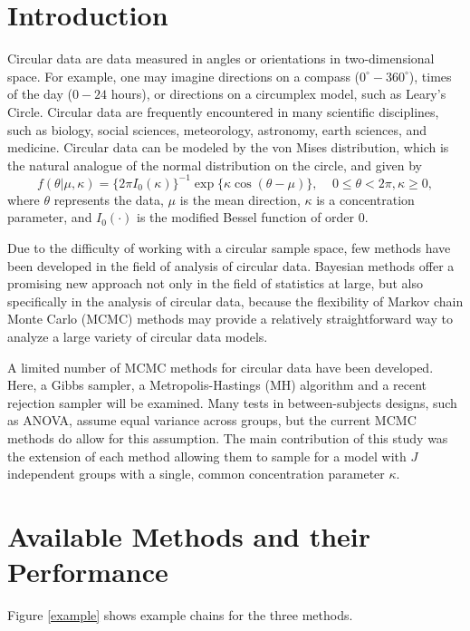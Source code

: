 \documentclass[11pt,a4paper]{article}
\begin{document}
\section{Introduction}
\label{Sect:intro}

Circular data are data measured in angles or orientations in two-dimensional space. For example, one may imagine directions on a compass ($0^\circ - 360^\circ$), times of the day ($0 - 24$ hours), or directions on a circumplex model, such as Leary's Circle. Circular data are frequently encountered in many scientific disciplines, such as biology, social sciences, meteorology, astronomy, earth sciences, and medicine. Circular data can be modeled by the von Mises distribution, which is the natural analogue of the normal distribution on the circle, and given by
$$ f(\theta \vert \mu, \kappa) = \{2 \pi I_0(\kappa)\}^{-1} \exp\{\kappa \cos(\theta - \mu)\} , ~~~~~ 0\leq \theta < 2\pi, \kappa \geq 0,$$
where $\theta$ represents the data, $\mu$ is the mean direction, $\kappa$ is a concentration parameter, and $I_0(\cdot)$ is the modified Bessel function of order 0.

Due to the difficulty of working with a circular sample space, few methods have been developed in the field of analysis of circular data. Bayesian methods offer a promising new approach not only in the field of statistics at large, but also specifically in the analysis of circular data, because the flexibility of Markov chain Monte Carlo (MCMC) methods may provide a relatively straightforward way to analyze a large variety of circular data models. 

A limited number of MCMC methods for circular data have been developed. Here, a Gibbs sampler, a Metropolis-Hastings (MH) algorithm \cite{Metropolis} and a recent rejection sampler will be examined. Many tests in between-subjects designs, such as ANOVA, assume equal variance across groups, but the current MCMC methods do allow for this assumption. The main contribution of this study was the extension of each method allowing them to sample for a model with $J$ independent groups with a single, common concentration parameter $\kappa$.

\section{Available Methods and their Performance}
\label{Sect:Methods}

Figure \ref{example} shows example chains for the three methods.
\end{document}
